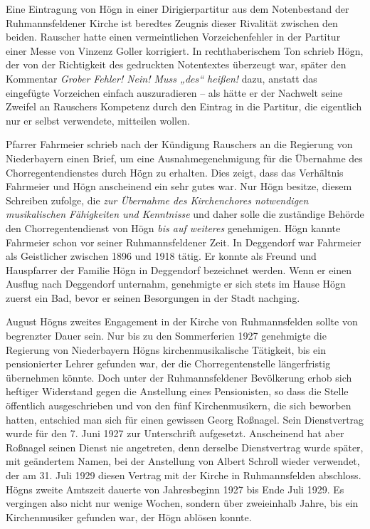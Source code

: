 \documentclass{book}
\newcommand{\zitat}[1]{\textit{#1}}
\begin{document}
Eine Eintragung von Högn in einer Dirigierpartitur aus dem Notenbestand
der Ruhmannsfeldener Kirche ist beredtes Zeugnis dieser Rivalität
zwischen den beiden. Rauscher hatte einen vermeintlichen
Vorzeichenfehler in der Partitur einer Messe von Vinzenz Goller
korrigiert. In rechthaberischem Ton schrieb Högn, der von der
Richtigkeit des gedruckten Notentextes überzeugt war, später den
Kommentar \zitat{Grober Fehler! Nein! Muss „des“ heißen!}
dazu, anstatt das eingefügte Vorzeichen einfach auszuradieren – als
hätte er der Nachwelt seine Zweifel an Rauschers Kompetenz durch den
Eintrag in die Partitur, die eigentlich nur er selbst verwendete,
mitteilen wollen.

Pfarrer Fahrmeier schrieb nach der Kündigung Rauschers an die Regierung
von Niederbayern einen Brief, um eine Ausnahmegenehmigung für die
Übernahme des Chorregentendienstes durch Högn zu erhalten. Dies
zeigt, dass das Verhältnis Fahrmeier und Högn anscheinend ein sehr
gutes war. Nur Högn besitze, diesem Schreiben zufolge, die
\zitat{zur Übernahme des Kirchenchores notwendigen
musikalischen Fähigkeiten und Kenntnisse} und daher solle die
zuständige Behörde den Chorregentendienst von Högn
\zitat{bis auf weiteres} genehmigen. Högn kannte Fahrmeier
schon vor seiner Ruhmannsfeldener Zeit. In Deggendorf war Fahrmeier als
Geistlicher zwischen 1896 und 1918 tätig. Er konnte als Freund und
Hauspfarrer der Familie Högn in Deggendorf bezeichnet werden. Wenn er
einen Ausflug nach Deggendorf unternahm, genehmigte er sich stets im
Hause Högn zuerst ein Bad, bevor er seinen Besorgungen in der Stadt
nachging.

August Högns zweites Engagement in der Kirche von Ruhmannsfelden sollte
von begrenzter Dauer sein. Nur bis zu den Sommerferien 1927
genehmigte die Regierung von Niederbayern Högns kirchenmusikalische
Tätigkeit, bis ein pensionierter Lehrer gefunden war, der die
Chorregentenstelle längerfristig übernehmen könnte. Doch unter der
Ruhmannsfeldener Bevölkerung erhob sich heftiger Widerstand gegen die
Anstellung eines Pensionisten, so dass die Stelle öffentlich
ausgeschrieben und von den fünf Kirchenmusikern, die sich beworben
hatten, entschied man sich für einen gewissen Georg Roßnagel. Sein
Dienstvertrag wurde für den 7. Juni 1927 zur Unterschrift aufgesetzt.
Anscheinend hat aber Roßnagel seinen Dienst nie angetreten, denn
derselbe Dienstvertrag wurde später, mit geändertem Namen, bei der
Anstellung von Albert Schroll wieder verwendet, der am 31. Juli 1929
diesen Vertrag mit der Kirche in Ruhmannsfelden abschloss. Högns zweite
Amtszeit dauerte von Jahresbeginn 1927 bis Ende Juli 1929. Es vergingen
also nicht nur wenige Wochen, sondern über zweieinhalb Jahre, bis ein
Kirchenmusiker gefunden war, der Högn ablösen konnte.
\end{document}
